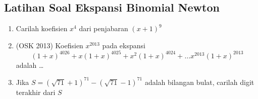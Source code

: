 \subsection{Latihan Soal Ekspansi Binomial Newton}
\begin{enumerate}
    \item Carilah koefisien $x^4$ dari penjabaran $(x+1)^9$

\item (OSK 2013) Koefisien $x^{2013}$ pada ekspansi
$$(1+x)^{4026}+x(1+x)^{4025}+x^2(1+x)^{4024}+\dots x^{2013}(1+x)^{2013}$$
adalah \dots

\item Jika $S=(\sqrt{71}+1)^{71}-(\sqrt{71}-1)^{71}$ adalah bilangan bulat, carilah digit terakhir dari $S$
\end{enumerate}